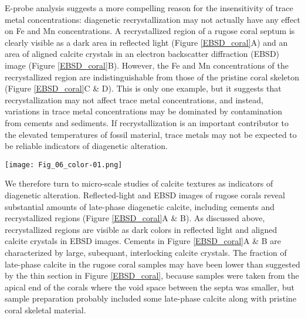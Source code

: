\documentclass[5p, authoryear]{elsarticle}
\begin{document}
E-probe analysis suggests a more compelling reason for the insensitivity of trace metal concentrations: diagenetic recrystallization may not actually have any effect on Fe and Mn concentrations. A recrystallized region of a rugose coral septum is clearly visible as a dark area in reflected light (Figure \ref{EBSD_coral}A) and an area of aligned calcite crystals in an electron backscatter diffraction (EBSD) image (Figure \ref{EBSD_coral}B). However, the Fe and Mn concentrations of the recrystallized region are indistinguishable from those of the pristine coral skeleton (Figure \ref{EBSD_coral}C \& D). This is only one example, but it suggests that recrystallization may not affect trace metal concentrations, and instead, variations in trace metal concentrations may be dominated by contamination from cements and sediments. If recrystallization is an important contributor to the elevated temperatures of fossil material, trace metals may not be expected to be reliable indicators of diagenetic alteration.

\begin{figure*}[tb]
\centering
\texttt{[image: Fig\_06\_color-01.png]}
\caption{Calcite fabric and trace metal concentrations in a rugose coral. The four images show the same area of a rugose coral thin section, all at the same magnification. The black bar at the bottom of panel B is 500 $\mu$m long for scale. A) Transmitted light. The dark triangle labelled ``RC'' was identified as a recrystallized domain of the coral septum. Cement in the void space between coral septa appears as blocky calcite crystals. B) Electron backscatter diffraction (EBSD) analysis. The orientation of calcite crystals is indicated by different shades. The recrystallized domain is clearly marked by many calcite crystals with the same orientation. C) Iron and D) manganese concentrations measured using the E-probe. The maps are qualitative, with darker shades representing higher concentrations. For both metals, the recrystallized domain is indistinguishable from the rest of the septum. The black lines show the location of an array of 62 spots where trace metal concentrations were measured quantitatively. The concentration of Fe and Mn at these spots is plotted to the right of the respective map.}
\label{EBSD_coral}
\end{figure*}

We therefore turn to micro-scale studies of calcite textures as indicators of diagenetic alteration. Reflected-light and EBSD images of rugose corals reveal substantial amounts of late-phase diagenetic calcite, including cements and recrystallized regions (Figure \ref{EBSD_coral}A \& B). As discussed above, recrystallized regions are visible as dark colors in reflected light and aligned calcite crystals in EBSD images. Cements in Figure \ref{EBSD_coral}A \& B are characterized by large, subequant, interlocking calcite crystals. The fraction of late-phase calcite in the rugose coral samples may have been lower than suggested by the thin section in Figure \ref{EBSD_coral}, because samples were taken from the apical end of the corals where the void space between the septa was smaller, but sample preparation probably included some late-phase calcite along with pristine coral skeletal material. 
\end{document}
